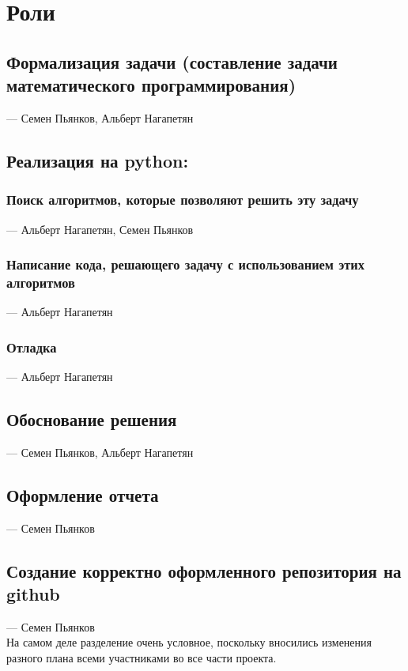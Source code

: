 \documentclass{article}
\begin{document}
\section{}

\section{Роли}

\subsection{Формализация задачи (составление задачи математического программирования)} --- Семен Пьянков, Альберт Нагапетян
\subsection{Реализация на python:}
    \subsubsection{Поиск алгоритмов, которые позволяют решить эту задачу} --- Альберт Нагапетян, Семен Пьянков
    \subsubsection{Написание кода, решающего задачу с использованием этих алгоритмов} --- Альберт Нагапетян
    \subsubsection{Отладка} --- Альберт Нагапетян %
\subsection{Обоснование решения} --- Семен Пьянков, Альберт Нагапетян
\subsection{Оформление отчета} --- Семен Пьянков
\subsection{Создание корректно оформленного репозитория на github} --- Семен Пьянков\\

На самом деле разделение очень условное, поскольку вносились изменения разного плана всеми участниками во все части проекта.\\
\end{document}
